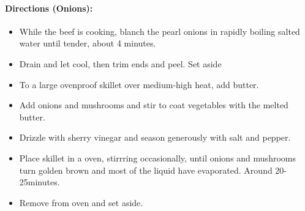 \documentclass{article}
\begin{document}
\paragraph{Directions (Onions):}
\begin{itemize}
    \item While the beef is cooking, blanch the pearl onions in rapidly boiling salted water until tender, about 4 minutes.
    \item Drain and let cool, then trim ends and peel. Set aside
    \item To a large ovenproof skillet over medium-high heat, add butter.
    \item Add onions and mushrooms and stir to coat vegetables with the melted butter.
    \item Drizzle with sherry vinegar and season generously with salt and pepper.
    \item Place skillet in a oven, stirrring occasionally, until onions and mushrooms turn golden brown and most of the liquid have evaporated. Around 20-25minutes.
    \item Remove from oven and set aside.
\end{itemize}  
\end{document}
